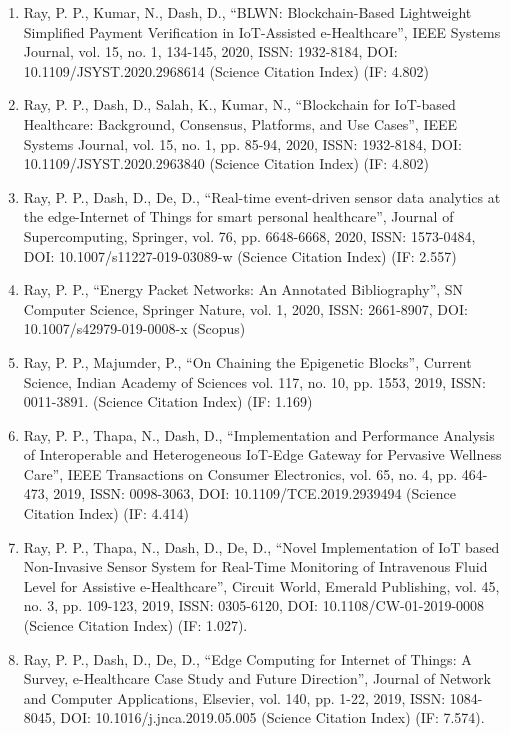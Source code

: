 \documentclass[11pt,a4paper]{moderncv}
\begin{document}
\begin{adjustwidth}{6em}{0pt}
\begin{enumerate}
		\item Ray, P. P., Kumar, N., Dash, D., “BLWN: Blockchain-Based Lightweight Simplified Payment Verification in IoT-Assisted e-Healthcare”, IEEE Systems Journal, vol. 15, no. 1, 134-145, 2020, ISSN: 1932-8184, DOI: 10.1109/JSYST.2020.2968614 (Science Citation Index) (IF: 4.802) 
		
		\item Ray, P. P., Dash, D., Salah, K., Kumar, N., “Blockchain for IoT-based Healthcare: Background, Consensus, Platforms, and Use Cases”, IEEE Systems Journal, vol. 15, no. 1, pp. 85-94, 2020, ISSN: 1932-8184, DOI: 10.1109/JSYST.2020.2963840 (Science Citation Index) (IF: 4.802) 
		
		\item Ray, P. P., Dash, D., De, D., “Real-time event-driven sensor data analytics at the edge-Internet of Things for smart personal healthcare”, Journal of Supercomputing, Springer, vol. 76, pp. 6648-6668, 2020, ISSN: 1573-0484, DOI: 10.1007/s11227-019-03089-w (Science Citation Index) (IF: 2.557) 
		
		\item Ray, P. P., “Energy Packet Networks: An Annotated Bibliography”, SN Computer Science, Springer Nature, vol. 1, 2020, ISSN: 2661-8907, DOI: 10.1007/s42979-019-0008-x (Scopus)
		
		\item Ray, P. P., Majumder, P., “On Chaining the Epigenetic Blocks”, Current Science, Indian Academy of Sciences vol. 117, no. 10, pp. 1553, 2019, ISSN: 0011-3891. (Science Citation Index) (IF: 1.169)
		
		\item Ray, P. P., Thapa, N., Dash, D., “Implementation and Performance Analysis of Interoperable and Heterogeneous IoT-Edge Gateway for Pervasive Wellness Care”, IEEE Transactions on Consumer Electronics, vol. 65, no. 4, pp. 464-473, 2019, ISSN: 0098-3063, DOI: 10.1109/TCE.2019.2939494 (Science Citation Index) (IF: 4.414) 
		
		\item 	Ray, P. P., Thapa, N., Dash, D., De, D., “Novel Implementation of IoT based Non-Invasive Sensor System for Real-Time Monitoring of Intravenous Fluid Level for Assistive e-Healthcare”, Circuit World, Emerald Publishing, vol. 45, no. 3, pp. 109-123, 2019, ISSN: 0305-6120, DOI: 10.1108/CW-01-2019-0008 (Science Citation Index) (IF: 1.027). 
		
		\item Ray, P. P., Dash, D., De, D., “Edge Computing for Internet of Things: A Survey, e-Healthcare Case Study and Future Direction”, Journal of Network and Computer Applications, Elsevier, vol. 140, pp. 1-22, 2019, ISSN: 1084-8045, DOI: 10.1016/j.jnca.2019.05.005 (Science Citation Index) (IF: 7.574). 
		

\end{enumerate}
\end{adjustwidth}
\end{document}
